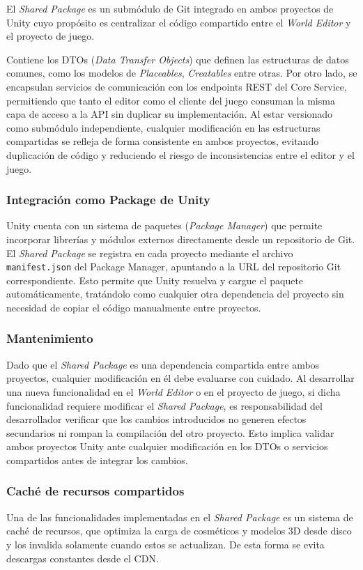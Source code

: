 El \textit{Shared Package} es un submódulo de Git integrado en ambos proyectos de Unity cuyo propósito es
centralizar el código compartido entre el \textit{World Editor} y el proyecto de juego. 

\vspace{0.25cm}

Contiene los DTOs (\textit{Data Transfer Objects}) que definen las estructuras de datos comunes, como los modelos de
\textit{Placeables}, \textit{Creatables} entre otras. Por otro lado, se encapsulan servicios de comunicación
con los endpoints REST del Core Service, permitiendo que tanto el editor como el cliente del juego
consuman la misma capa de acceso a la API sin duplicar su implementación. Al estar versionado como
submódulo independiente, cualquier modificación en las estructuras compartidas se refleja de forma
consistente en ambos proyectos, evitando duplicación de código y reduciendo el riesgo de inconsistencias
entre el editor y el juego.

\subsubsection{Integración como Package de Unity}

Unity cuenta con un sistema de paquetes (\textit{Package Manager}) que permite incorporar librerías y
módulos externos directamente desde un repositorio de Git. El \textit{Shared Package} se registra en
cada proyecto mediante el archivo \texttt{manifest.json} del Package Manager, apuntando a la URL del
repositorio Git correspondiente. Esto permite que Unity resuelva y cargue el paquete automáticamente,
tratándolo como cualquier otra dependencia del proyecto sin necesidad de copiar el código manualmente
entre proyectos.

\subsubsection{Mantenimiento}
Dado que el \textit{Shared Package} es una dependencia compartida entre ambos proyectos, cualquier
modificación en él debe evaluarse con cuidado. Al desarrollar una nueva funcionalidad en el \textit{World Editor}
o en el proyecto de juego, si dicha funcionalidad requiere modificar el \textit{Shared Package}, es
responsabilidad del desarrollador verificar que los cambios introducidos no generen efectos secundarios
ni rompan la compilación del otro proyecto. Esto implica validar ambos proyectos Unity ante cualquier
modificación en los DTOs o servicios compartidos antes de integrar los cambios.

\subsubsection{Caché de recursos compartidos}
Una de las funcionalidades implementadas en el \textit{Shared Package} es un sistema de caché de recursos, 
que optimiza la carga de cosméticos y modelos 3D desde disco y los invalida solamente cuando estos se actualizan. 
De esta forma se evita descargas constantes desde el CDN.

